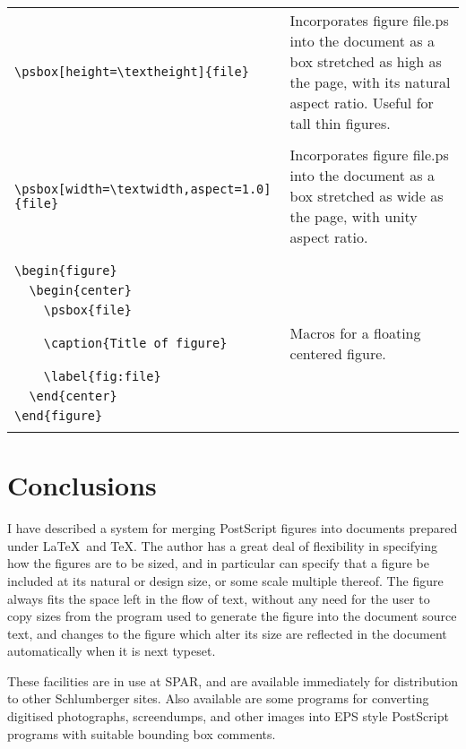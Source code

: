 \begin{table*}[p]
\begin{center}
\begin{tabular}{lp{3.5in}}
      \verb|\psbox[height=\textheight]{file}| &
	Incorporates figure {file.ps} into the document as a box
	stretched as high as the page, with its natural aspect
	ratio.  Useful for tall thin figures. \\
      \\
      \verb|\psbox[width=\textwidth,aspect=1.0]{file}| &
	Incorporates figure {file.ps} into the document as a box
	stretched as wide as the page, with unity aspect ratio. \\
      \\
      \hline
      \\
	\verb|\begin{figure}| \\
        \verb|  \begin{center}| \\
        \verb|    \psbox{file}| \\
        \verb|    \caption{Title of figure}|
	  & Macros for a floating centered figure. \\
        \verb|    \label{fig:file}| \\
        \verb|  \end{center}| \\
        \verb|\end{figure}| \\
      \\
      \hline
    \end{tabular}
  \end{center}
\end{table*}

\section{Conclusions}

I have described a system for merging PostScript figures into
documents prepared under \LaTeX\ and \TeX.
The author has a great deal of flexibility in
specifying how the figures are to be sized,
and in particular can specify that a figure be included
at its natural or design size, or some scale multiple thereof.
The figure always fits the space left in the flow of text,
without any need for the user to copy sizes from
the program used to generate the figure into the document source text,
and changes to the figure which alter its size
are reflected in the document automatically when it is next typeset.

These facilities are in use at SPAR,
and are available immediately for distribution to other Schlumberger sites.
Also available are some programs for converting digitised photographs,
screendumps, and other images into EPS style PostScript programs
with suitable bounding box comments.

